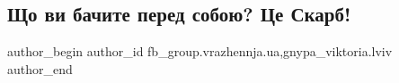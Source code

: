  
 
 
 
 

\subsection{Що ви бачите перед собою? Це Скарб!}
\label{sec:21_01_2023.fb.fb_group.vrazhennja.ua.1.shcho_vi_bachite_per}
 
\ifcmt
 author_begin
   author_id fb_group.vrazhennja.ua,gnypa_viktoria.lviv
 author_end
\fi
